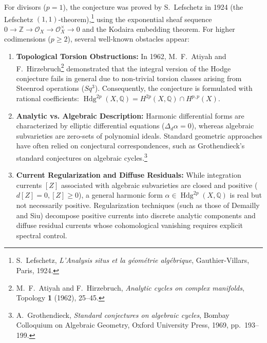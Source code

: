 \documentclass[11pt,a4paper]{article}
\theoremstyle{definition}
\theoremstyle{plain}
\DeclareMathOperator{\Hdg}{Hdg}
\begin{document}
For divisors ($p = 1$), the conjecture was proved by S.~Lefschetz in 1924 (the Lefschetz $(1,1)$-theorem),\footnote{S.~Lefschetz, \emph{L'Analysis situs et la g\'eom\'etrie alg\'ebrique}, Gauthier-Villars, Paris, 1924.} using the exponential sheaf sequence $0 \to \mathbb{Z} \to \mathcal{O}_X \to \mathcal{O}_X^\times \to 0$ and the Kodaira embedding theorem. For higher codimensions ($p \ge 2$), several well-known obstacles appear:
\begin{enumerate}[label=(\Roman*)]
    \item \textbf{Topological Torsion Obstructions:} In 1962, M.~F.~Atiyah and F.~Hirzebruch\footnote{M.~F.~Atiyah and F.~Hirzebruch, \emph{Analytic cycles on complex manifolds}, Topology \textbf{1} (1962), 25--45.} demonstrated that the integral version of the Hodge conjecture fails in general due to non-trivial torsion classes arising from Steenrod operations ($Sq^3$). Consequently, the conjecture is formulated with rational coefficients: $\Hdg^{2p}(X, \mathbb{Q}) = H^{2p}(X, \mathbb{Q}) \cap H^{p,p}(X)$.
    \item \textbf{Analytic vs. Algebraic Description:} Harmonic differential forms are characterized by elliptic differential equations ($\Delta_d \alpha = 0$), whereas algebraic subvarieties are zero-sets of polynomial ideals. Standard geometric approaches have often relied on conjectural correspondences, such as Grothendieck's standard conjectures on algebraic cycles.\footnote{A.~Grothendieck, \emph{Standard conjectures on algebraic cycles}, Bombay Colloquium on Algebraic Geometry, Oxford University Press, 1969, pp.~193--199.}
    \item \textbf{Current Regularization and Diffuse Residuals:} While integration currents $[Z]$ associated with algebraic subvarieties are closed and positive ($d[Z] = 0, [Z] \ge 0$), a general harmonic form $\alpha \in \Hdg^{2p}(X, \mathbb{Q})$ is real but not necessarily positive. Regularization techniques (such as those of Demailly and Siu) decompose positive currents into discrete analytic components and diffuse residual currents whose cohomological vanishing requires explicit spectral control.
\end{enumerate}
\end{document}
